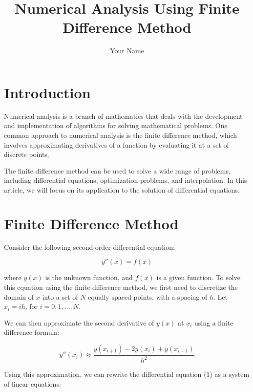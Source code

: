 \documentclass{article}
\title{Numerical Analysis Using Finite Difference Method}
\author{Your Name}
\date{}
\begin{document}
\maketitle

\section{Introduction}

Numerical analysis is a branch of mathematics that deals with the development and implementation of algorithms for solving mathematical problems. One common approach to numerical analysis is the finite difference method, which involves approximating derivatives of a function by evaluating it at a set of discrete points.

The finite difference method can be used to solve a wide range of problems, including differential equations, optimization problems, and interpolation. In this article, we will focus on its application to the solution of differential equations.

\section{Finite Difference Method}

Consider the following second-order differential equation:

\begin{equation}
y''(x) = f(x)
\end{equation}

where $y(x)$ is the unknown function, and $f(x)$ is a given function. To solve this equation using the finite difference method, we first need to discretize the domain of $x$ into a set of $N$ equally spaced points, with a spacing of $h$. Let $x_i = ih$, for $i=0,1,\dots,N$.

We can then approximate the second derivative of $y(x)$ at $x_i$ using a finite difference formula:

\begin{equation}
y''(x_i) \approx \frac{y(x_{i+1}) - 2y(x_i) + y(x_{i-1})}{h^2}
\end{equation}

Using this approximation, we can rewrite the differential equation (1) as a system of linear equations:
\end{document}
